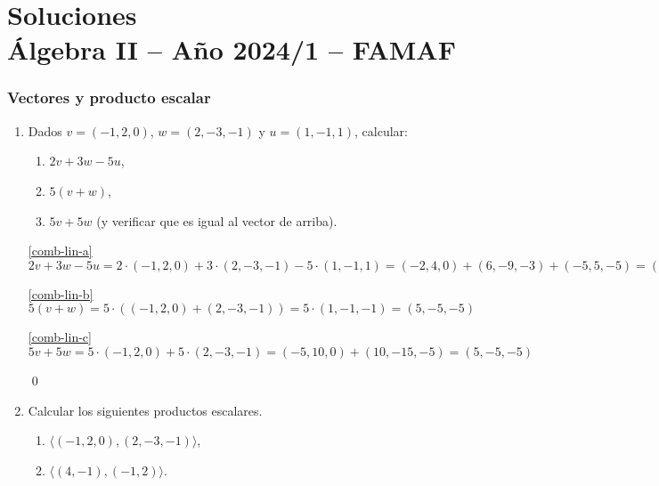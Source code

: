 \chapter{Soluciones\\Álgebra  II -- Año 2024/1 -- FAMAF}\label{practico-1}
    


\subsection*{Vectores y producto escalar}

\begin{enumerate}[topsep=6pt, itemsep=.4cm]


    \item Dados $v = (-1, 2, 0)$, $w = (2,-3,-1)$ y $u = (1,-1,1)$, calcular:
    \begin{enumerate}
        \item\label{comb-lin-a} $2v + 3w -5u$,
        \item\label{comb-lin-b} $5(v+w)$,
        \item\label{comb-lin-c} $5v + 5w$ (y verificar que es igual al vector de arriba).
    \end{enumerate}

\rta

  \ref{comb-lin-a} $2v + 3w -5u = 2 \cdot (-1, 2, 0) + 3 \cdot (2,-3,-1) - 5 \cdot (1,-1,1)  = (-2, 4, 0) + (6,-9,-3) + (-5,5,-5) = \boxed{(-1,0,-8)}$

\ref{comb-lin-b} $5(v+w) = 5 \cdot ( (-1, 2, 0) + (2,-3,-1) ) = 5 \cdot (1,-1,-1) = \boxed{(5,-5,-5)} $


\ref{comb-lin-c} $5v + 5w = 5 \cdot (-1, 2, 0) + 5 \cdot (2,-3,-1) = (-5, 10, 0) + (10,-15,-5)= \boxed{(5,-5,-5)}$


\qed


\item Calcular los siguientes productos escalares. %
\begin{enumerate}
  \item\label{prod-esc-a} $\langle (-1, 2, 0) ,(2,-3,-1) \rangle$,
  \item\label{prod-esc-b}  $\langle (4,-1),(-1,2) \rangle$.
\end{enumerate}


\end{enumerate}

